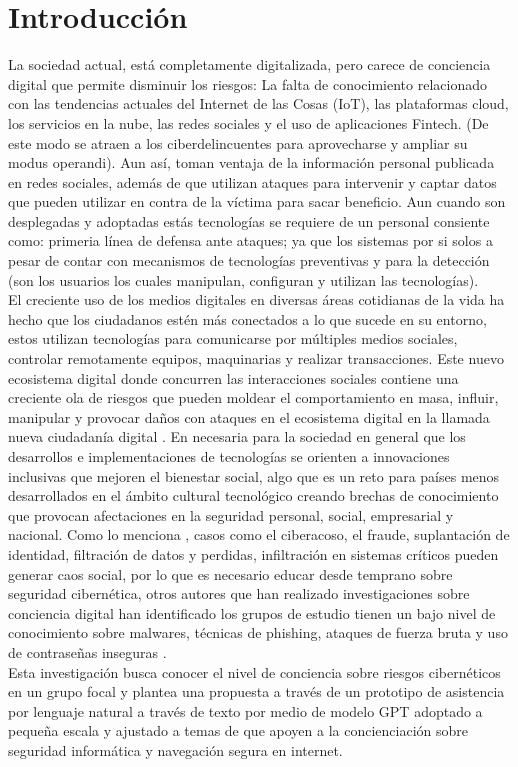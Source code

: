 \chapter{Introducción}\label{cap:capitulo_1}
La sociedad actual, está completamente digitalizada, pero carece de conciencia digital que permite disminuir los riesgos: La falta de conocimiento relacionado con las tendencias actuales del Internet de las Cosas (IoT), las plataformas cloud, los servicios en la nube, las redes sociales y el uso de aplicaciones Fintech. (De este modo se atraen a los ciberdelincuentes para aprovecharse y ampliar su modus operandi). Aun así, toman ventaja de la información personal publicada en redes sociales, además de que utilizan ataques para intervenir y captar datos que pueden utilizar en contra de la víctima para sacar beneficio. Aun cuando son desplegadas y adoptadas estás tecnologías se requiere de un personal consiente como: primeria línea de defensa ante ataques; ya que los sistemas por si solos a pesar de contar con mecanismos de tecnologías preventivas y para la detección (son los usuarios los cuales manipulan, configuran y utilizan las tecnologías). \\
El creciente uso de los medios digitales en diversas áreas cotidianas de la vida ha hecho que los ciudadanos estén más conectados a lo que sucede en su entorno, estos utilizan tecnologías para comunicarse por múltiples medios sociales, controlar remotamente equipos, maquinarias y realizar transacciones. Este nuevo ecosistema digital donde concurren las interacciones sociales contiene una creciente ola de riesgos que pueden moldear el comportamiento en masa, influir, manipular y provocar daños con ataques en el ecosistema digital en la llamada nueva ciudadanía digital \cite{A2020}. En necesaria para la sociedad en general que los desarrollos e implementaciones de tecnologías se orienten a innovaciones inclusivas que mejoren el bienestar social, algo que es un reto para países menos desarrollados en el ámbito cultural tecnológico creando brechas de conocimiento que provocan afectaciones en la seguridad personal, social, empresarial y nacional. Como lo menciona  \cite{Nadeesha2021}, casos como el ciberacoso, el fraude, suplantación de identidad, filtración de datos y perdidas, infiltración en sistemas críticos pueden generar caos social, por lo que es necesario educar desde temprano sobre seguridad cibernética, otros autores que han realizado investigaciones sobre conciencia digital han identificado los grupos de estudio tienen un bajo nivel de conocimiento sobre malwares, técnicas de phishing, ataques de fuerza bruta y uso de contraseñas inseguras \cite{Eslavova2019}. \\
Esta investigación busca conocer el nivel de conciencia sobre riesgos cibernéticos en un grupo focal y plantea una propuesta a través de un prototipo de asistencia por lenguaje natural a través de texto por medio de modelo GPT adoptado a pequeña escala y ajustado a temas de que apoyen a la concienciación sobre seguridad informática y navegación segura en internet.
 

